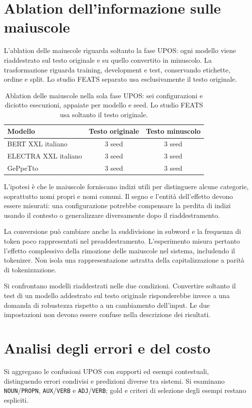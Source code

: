 \documentclass[12pt,a4paper]{report}
\begin{document}
\section{Ablation dell'informazione sulle maiuscole}
\label{sec:ablation}
L'ablation delle maiuscole riguarda soltanto la fase UPOS: ogni modello viene riaddestrato sul testo originale e su quello convertito in minuscolo. La trasformazione riguarda training, development e test, conservando etichette, ordine e split. Lo studio FEATS separato usa esclusivamente il testo originale.

\begin{table}[!htbp]
\centering
\begin{tabularx}{\textwidth}{Xcc}
\toprule
Modello & Testo originale & Testo minuscolo\\
\midrule
BERT XXL italiano & 3 seed & 3 seed\\
ELECTRA XXL italiano & 3 seed & 3 seed\\
GePpeTto & 3 seed & 3 seed\\
\bottomrule
\end{tabularx}
\caption{Ablation delle maiuscole nella sola fase UPOS: sei configurazioni e diciotto esecuzioni, appaiate per modello e seed. Lo studio FEATS usa soltanto il testo originale.}
\label{tab:ablation}
\end{table}

L'ipotesi è che le maiuscole forniscano indizi utili per distinguere alcune categorie, soprattutto nomi propri e nomi comuni. Il segno e l'entità dell'effetto devono essere misurati: una configurazione potrebbe compensare la perdita di indizi usando il contesto o generalizzare diversamente dopo il riaddestramento.

La conversione può cambiare anche la suddivisione in subword e la frequenza di token poco rappresentati nel preaddestramento. L'esperimento misura pertanto l'effetto complessivo della rimozione delle maiuscole nel sistema, includendo il tokenizer. Non isola una rappresentazione astratta della capitalizzazione a parità di tokenizzazione.

Si confrontano modelli riaddestrati nelle due condizioni. Convertire soltanto il test di un modello addestrato sul testo originale risponderebbe invece a una domanda di robustezza rispetto a un cambiamento dell'input. Le due impostazioni non devono essere confuse nella descrizione dei risultati.

\section{Analisi degli errori e del costo}
Si aggregano le confusioni UPOS con supporti ed esempi contestuali, distinguendo errori condivisi e predizioni diverse tra sistemi. Si esaminano \texttt{NOUN}/\texttt{PROPN}, \texttt{AUX}/\texttt{VERB} e \texttt{ADJ}/\texttt{VERB}; gold e criteri di selezione degli esempi restano espliciti.
\end{document}
